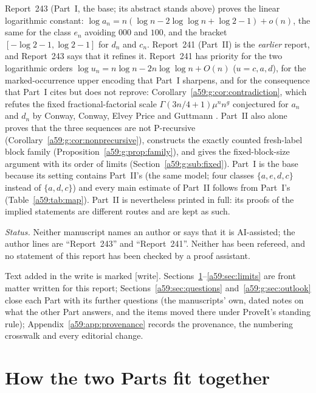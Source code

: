 \documentclass[11pt,letterpaper]{article}
\theoremstyle{remark}\newtheorem{remark}[theorem]{Remark}
\newcommand{\wtag}{\textup{[write]}}
\theoremstyle{remark}\newtheorem{wremark}{Remark}\renewcommand{\thewremark}{W\arabic{wremark}}
\theoremstyle{plain}\newtheorem{wcorollary}[wremark]{Corollary}
\begin{document}
Report~243 (Part~I, the base; its abstract stands above) proves the
linear logarithmic constant: $\log a_n=n(\log n-2\log\log n+\log2-1)+o(n)$,
the same for the class $e_n$ avoiding $000$ and $100$, and the bracket
$[-\log2-1,\log2-1]$ for $d_n$ and $c_n$. Report~241 (Part~II) is the
\emph{earlier} report, and Report~243 says that it refines it. Report~241
has priority for the two logarithmic orders
$\log u_n=n\log n-2n\log\log n+O(n)$ ($u=c,a,d$), for the marked-occurrence
upper encoding that Part~I sharpens, and for the consequence that Part~I
cites but does not reprove: Corollary~\ref{a59:g:cor:contradiction}, which
refutes the fixed fractional-factorial scale
$\Gamma(3n/4+1)\mu^nn^g$ conjectured for $a_n$ and $d_n$ by Conway,
Conway, Elvey Price and Guttmann \cite[Sections~6--7]{conway}. Part~II
also alone proves that the three sequences are not P-recursive
(Corollary~\ref{a59:g:cor:nonprecursive}), constructs the exactly counted
fresh-label block family (Proposition~\ref{a59:g:prop:family}), and gives the
fixed-block-size argument with its order of limits
(Section~\ref{a59:g:sub:fixed}). Part~I is the base because its setting
contains Part~II's (the same model; four classes $\{a,e,d,c\}$ instead of
$\{a,d,c\}$) and every main estimate of Part~II follows from Part~I's
(Table~\ref{a59:tab:map}). Part~II is nevertheless printed in full: its
proofs of the implied statements are different routes and are kept as
such.

\emph{Status.} Neither manuscript names an author or says that it is
AI-assisted; the author lines are ``Report~243'' and ``Report~241''.
Neither has been refereed, and no statement of this report has been checked
by a proof assistant.

Text added in the write is marked \wtag. Sections~\ref{a59:sec:guide}--\ref{a59:sec:limits}
are front matter written for this report;
Sections~\ref{a59:sec:questions} and~\ref{a59:g:sec:outlook} close each
Part with its further questions (the manuscripts' own, dated notes on
what the other Part answers, and the items moved there under ProveIt's
standing rule); Appendix~\ref{a59:app:provenance} records the provenance,
the numbering crosswalk and every editorial change.

\setcounter{tocdepth}{1}
\tableofcontents
\newpage

\section{How the two Parts fit together}\label{a59:sec:guide}
\end{document}
